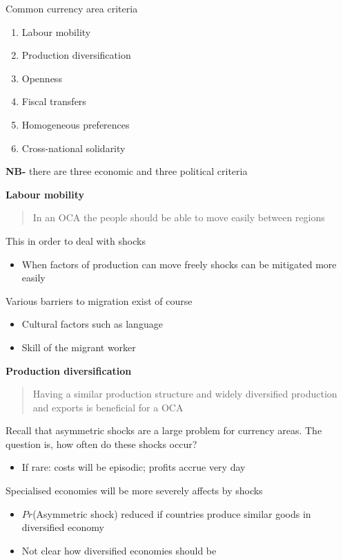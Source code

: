 \documentclass{beamer}
\begin{document}
\begin{frame}
  Common currency area criteria
  \begin{enumerate}
    \item Labour mobility
    \item Production diversification
    \item Openness
    \item Fiscal transfers
    \item Homogeneous preferences
    \item Cross-national solidarity
  \end{enumerate}
  \medskip
  \textbf{NB-} there are three economic and three political criteria
\end{frame}

\begin{frame}
  \textbf{Labour mobility} 
  \begin{quote}
    In an OCA the people should be able to move easily between regions
  \end{quote}
  \medskip
  This in order to deal with shocks
  \begin{itemize}
    \item When factors of production can move freely shocks can be mitigated more easily
  \end{itemize}
  \medskip
  Various barriers to migration exist of course
  \begin{itemize}
    \item Cultural factors such as language
    \item Skill of the migrant worker
  \end{itemize}
\end{frame}

\begin{frame}
  \textbf{Production diversification}
  \begin{quote}
    Having a similar production structure and widely diversified production and exports is beneficial for a OCA
  \end{quote}
   Recall that asymmetric shocks are a large problem for currency areas. The question is, how often do these shocks occur?
  \begin{itemize}    
    \item If rare: costs will be episodic; profits accrue very day
  \end{itemize}
  \medskip
  Specialised economies will be more severely affects by shocks
  \begin{itemize}
    \item $Pr$(Asymmetric shock) reduced if countries produce similar goods in diversified economy
    \item Not clear how diversified economies should be
  \end{itemize}
\end{frame}
\end{document}
